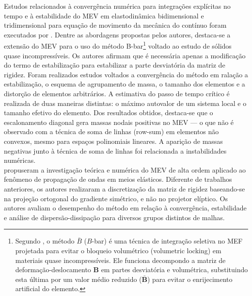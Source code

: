 \indent Estudos relacionados à convergência numérica para integrações explícitas no tempo e à estabilidade do MEV em elastodinâmica bidimensional e tridimensional para equação de movimento da mecânica do contínuo foram executados por \citet{numericalrecipeselastodynamicvirtualelementmethodsexplicittimeintegration2020}. Dentre as abordagens propostas pelos autores, destaca-se a extensão do MEV para o uso do método B-bar\footnote{Segundo \citet{hughes1987finite}, o método $\bar{B}$ ($B$-bar) é uma técnica de integração seletiva no MEF projetada para evitar o bloqueio volumétrico (volumetric locking) em materiais quase incompressíveis. Ele funciona decompondo a matriz de deformação-deslocamento $\mathbf{B}$ em partes desviatória e volumétrica, substituindo esta última por um valor médio reduzido ($\bar{\mathbf{B}}$) para evitar o enrijecimento artificial do elemento.} voltado ao estudo de sólidos quase incompressíveis. Os autores afirmam que é necessária apenas a modificação do termo de estabilização para estabilizar a parte desviatória da matriz de rigidez. Foram realizados estudos voltados a convergência do método em ralação a estabilização, o esquema de agrupamento de massa, o tamanho dos elementos e a distorção de elementos arbitrários. A estimativa do passo de tempo crítico é realizada de duas maneiras distintas: o máximo autovalor de um sistema local e o tamanho efetivo do elemento. Dos resultados obtidos, destaca-se que o escalonamento diagonal gera massas nodais positivas no MEV — o que não é observado com a técnica de soma de linhas (row-sum) em elementos não convexos, mesmo para espaços polinomiais lineares. A aparição de massas negativas junto à técnica de soma de linhas foi relacionada a instabilidades numéricas. \\
\indent \citet{antonietti2021arbitrary} propuseram a investigação teórica e numérica do MEV de alta ordem aplicado ao fenômeno de propagação de ondas em meios elásticos. Diferente de trabalhos anteriores, os autores realizaram a discretização da matriz de rigidez baseando-se na projeção ortogonal do gradiente simétrico, e não no projetor elíptico. Os autores avaliam o desempenho do método em relação à convergência, estabilidade e análise de dispersão-dissipação para diversos grupos distintos de malhas. \\
